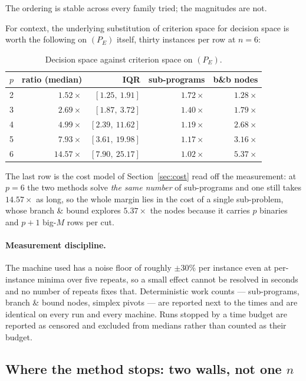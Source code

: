 \documentclass[11pt,a4paper]{article}
\begin{document}
\noindent
The ordering is stable across every family tried; the magnitudes are not.

For context, the underlying substitution of criterion space for decision space
is worth the following on $(P_E)$ itself, thirty instances per row at $n=6$:

\begin{table}[h]
\centering
\caption{Decision space against criterion space on $(P_E)$.}
\label{tab:margin}
\begin{tabular}{crrrr}
\toprule
$p$ & ratio (median) & IQR & sub-programs & b\&b nodes \\
\midrule
2 & $1.52\times$  & $[1.25,\ 1.91]$  & $1.72\times$ & $1.28\times$ \\
3 & $2.69\times$  & $[1.87,\ 3.72]$  & $1.40\times$ & $1.79\times$ \\
4 & $4.99\times$  & $[2.39,\ 11.62]$ & $1.19\times$ & $2.68\times$ \\
5 & $7.93\times$  & $[3.61,\ 19.98]$ & $1.17\times$ & $3.16\times$ \\
6 & $14.57\times$ & $[7.90,\ 25.17]$ & $\mathbf{1.02\times}$ & $\mathbf{5.37\times}$ \\
\bottomrule
\end{tabular}
\end{table}

\noindent
The last row is the cost model of Section~\ref{sec:cost} read off the
measurement: at $p=6$ the two methods solve \emph{the same number} of
sub-programs and one still takes $14.57\times$ as long, so the whole margin
lies in the cost of a single sub-problem, whose branch \& bound explores
$5.37\times$ the nodes because it carries $p$ binaries and $p+1$ big-$M$ rows
per cut.

\paragraph{Measurement discipline.}  The machine used has a noise floor of
roughly $\pm 30\%$ per instance even at per-instance minima over five repeats,
so a small effect cannot be resolved in seconds and no number of repeats fixes
that.  Deterministic work counts --- sub-programs, branch \& bound nodes,
simplex pivots --- are reported next to the times and are identical on every
run and every machine.  Runs stopped by a time budget are reported as censored
and excluded from medians rather than counted as their budget.

\subsection{Where the method stops: two walls, not one $n$}
\label{sec:walls}
\end{document}
